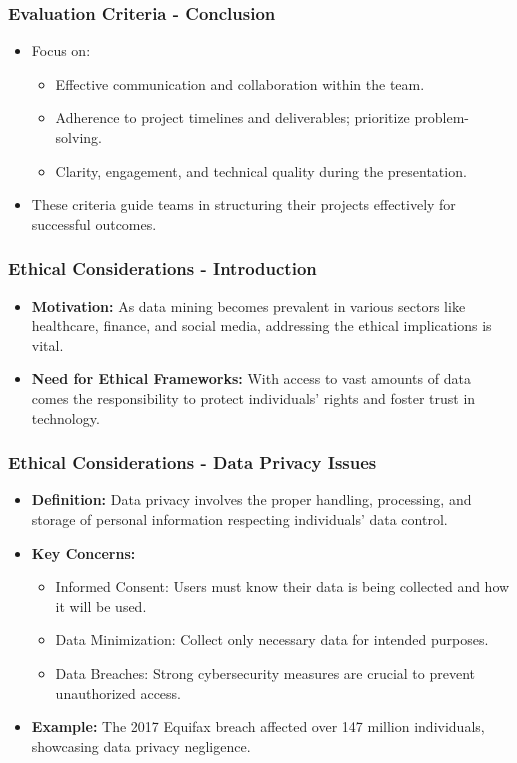 \documentclass[aspectratio=169]{beamer}
\begin{document}
\begin{frame}[fragile]
    \frametitle{Evaluation Criteria - Conclusion}
    \begin{itemize}
        \item Focus on:
        \begin{itemize}
            \item Effective communication and collaboration within the team.
            \item Adherence to project timelines and deliverables; prioritize problem-solving.
            \item Clarity, engagement, and technical quality during the presentation.
        \end{itemize}
        \item These criteria guide teams in structuring their projects effectively for successful outcomes.
    \end{itemize}
\end{frame}

\begin{frame}[fragile]
    \frametitle{Ethical Considerations - Introduction}
    \begin{itemize}
        \item \textbf{Motivation:} 
        As data mining becomes prevalent in various sectors like healthcare, finance, and social media, addressing the ethical implications is vital.
        \item \textbf{Need for Ethical Frameworks:} 
        With access to vast amounts of data comes the responsibility to protect individuals' rights and foster trust in technology.
    \end{itemize}
\end{frame}

\begin{frame}[fragile]
    \frametitle{Ethical Considerations - Data Privacy Issues}
    \begin{itemize}
        \item \textbf{Definition:} 
        Data privacy involves the proper handling, processing, and storage of personal information respecting individuals' data control.
        \item \textbf{Key Concerns:}
        \begin{itemize}
            \item Informed Consent: Users must know their data is being collected and how it will be used.
            \item Data Minimization: Collect only necessary data for intended purposes.
            \item Data Breaches: Strong cybersecurity measures are crucial to prevent unauthorized access.
        \end{itemize}
        \item \textbf{Example:} 
        The 2017 Equifax breach affected over 147 million individuals, showcasing data privacy negligence.
    \end{itemize}
\end{frame}
\end{document}
